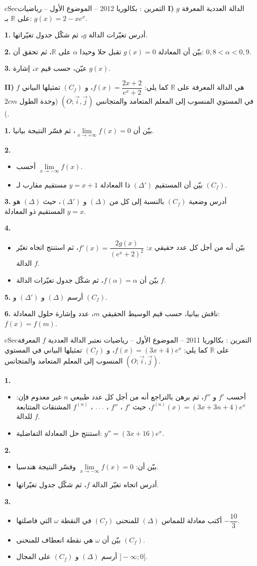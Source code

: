 \documentclass[12pt,a4paper]{article}
\newenvironment{BOX}[2]{\begin{otherlanguage}{english}\begin{arbox}{#1}{#2}}{\end{arbox}\end{otherlanguage}}
\newcounter{exo}
\newenvironment{tamrin}[1]{\stepcounter{exo}\begin{BOX}{cSec}{التمرين \theexo: #1}}{\end{BOX}}
\renewcommand{\ldots}{\mathinner{\ldotp\ldotp\ldotp}}
\newcommand{\R}{\mathbb{R}}
\newenvironment{sq}{\begin{itemize}[leftmargin=2.4em,itemsep=3pt]}{\end{itemize}}
\newcommand{\qa}{\item[(أ)]}\newcommand{\qb}{\item[(ب)]}\newcommand{\qc}{\item[(جـ)]}\newcommand{\qd}{\item[(د)]}\newcommand{\qe}{\item[(هـ)]}
\newcommand{\QQ}[1]{\par\smallskip\textbf{#1.} }
\begin{document}
\begin{tamrin}{بكالوريا 2012 -- الموضوع الأول -- رياضيات}
\textbf{I)} $g$ الدالة العددية المعرفة على $\R$ بـ: $g(x)=2-xe^{x}$.
\QQ{1} أدرس تغيّرات الدالة $g$، ثم شكّل جدول تغيّراتها.
\QQ{2} بيّن أن المعادلة $g(x)=0$ تقبل حلا وحيدا $\alpha$ على $\R$، ثم تحقق أن: $0{,}8<\alpha<0{,}9$.
\QQ{3} عيّن، حسب قيم $x$، إشارة $g(x)$.

\textbf{II)} $f$ هي الدالة المعرفة على $\R$ كما يلي: $f(x)=\dfrac{2x+2}{e^{x}+2}$،
و $(C_f)$ تمثيلها البياني في المستوي المنسوب إلى المعلم المتعامد والمتجانس $(O;\vec i,\vec j)$ (وحدة الطول $2cm$).
\QQ{1} بيّن أن $\lim\limits_{x\to+\infty}f(x)=0$، ثم فسّر النتيجة بيانيا.
\QQ{2}
\begin{sq}
\qa أحسب $\lim\limits_{x\to-\infty}f(x)$.
\qb بيّن أن المستقيم $(\Delta')$ ذا المعادلة $y=x+1$ مستقيم مقارب لـ $(C_f)$.
\end{sq}
\QQ{3} أدرس وضعية $(C_f)$ بالنسبة إلى كل من $(\Delta)$ و $(\Delta')$، حيث $(\Delta)$ هو المستقيم ذو المعادلة $y=x$.
\QQ{4}
\begin{sq}
\qa بيّن أنه من أجل كل عدد حقيقي $x$: $f'(x)=\dfrac{2g(x)}{(e^{x}+2)^2}$، ثم استنتج اتجاه تغيّر الدالة $f$.
\qb بيّن أن $f(\alpha)=\alpha$، ثم شكّل جدول تغيّرات الدالة $f$.
\end{sq}
\QQ{5} أرسم $(\Delta)$ و $(\Delta')$ و $(C_f)$.
\QQ{6} ناقش بيانيا، حسب قيم الوسيط الحقيقي $m$، عدد وإشارة حلول المعادلة: $f(x)=f(m)$.
\end{tamrin}

\begin{tamrin}{بكالوريا 2011 -- الموضوع الأول -- رياضيات}
نعتبر الدالة العددية $f$ المعرفة على $\R$ كما يلي: $f(x)=(3x+4)e^{x}$،
و $(C_f)$ تمثيلها البياني في المستوي المنسوب إلى المعلم المتعامد والمتجانس $(O;\vec i,\vec j)$.
\QQ{1}
\begin{sq}
\qa أحسب $f'$ و $f''$، ثم برهن بالتراجع أنه من أجل كل عدد طبيعي $n$ غير معدوم فإن: $f^{(n)}(x)=(3x+3n+4)e^{x}$، حيث $f'$ ، $f''$ ، $\ldots$ ، $f^{(n)}$ المشتقات المتتابعة للدالة $f$.
\qb استنتج حل المعادلة التفاضلية: $y''=(3x+16)e^{x}$.
\end{sq}
\QQ{2}
\begin{sq}
\qa بيّن أن: $\lim\limits_{x\to-\infty}f(x)=0$ وفسّر النتيجة هندسيا.
\qb أدرس اتجاه تغيّر الدالة $f$، ثم شكّل جدول تغيّراتها.
\end{sq}
\QQ{3}
\begin{sq}
\qa أكتب معادلة للمماس $(\Delta)$ للمنحنى $(C_f)$ في النقطة $\omega$ التي فاصلتها $-\dfrac{10}{3}$.
\qb بيّن أن $\omega$ هي نقطة انعطاف للمنحنى $(C_f)$.
\qc أرسم $(\Delta)$ و $(C_f)$ على المجال $]{-}\infty;0]$.
\end{sq}
\end{tamrin}
\end{document}
